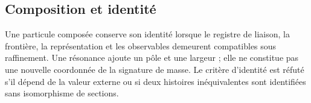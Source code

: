 \let\clearpage\relax

\endgroup
\begingroup
\let\chapter\section
\let\section\subsection
\let\subsection\subsubsection
\let\subsubsection\paragraph
\let\clearpage\relax

\endgroup

\section{Composition et identité}
Une particule composée conserve son identité lorsque le registre de liaison, la frontière, la représentation et les observables demeurent compatibles sous raffinement. Une résonance ajoute un pôle et une largeur ; elle ne constitue pas une nouvelle coordonnée de la signature de masse. Le critère d’identité est réfuté s’il dépend de la valeur externe ou si deux histoires inéquivalentes sont identifiées sans isomorphisme de sections.
